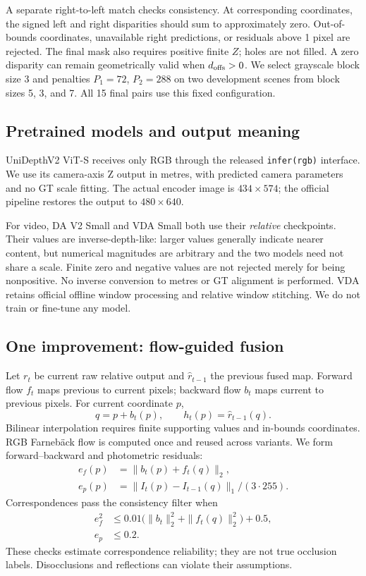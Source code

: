 A separate right-to-left match checks consistency. At corresponding coordinates, the signed left and right disparities should sum to approximately zero. Out-of-bounds coordinates, unavailable right predictions, or residuals above 1 pixel are rejected. The final mask also requires positive finite $Z$; holes are not filled. A zero disparity can remain geometrically valid when $d_{\rm offs}>0$. We select grayscale block size 3 and penalties $P_1=72$, $P_2=288$ on two development scenes from block sizes 5, 3, and 7. All 15 final pairs use this fixed configuration.

\subsection{Pretrained models and output meaning}
UniDepthV2 ViT-S receives only RGB through the released \texttt{infer(rgb)} interface. We use its camera-axis Z output in metres, with predicted camera parameters and no GT scale fitting. The actual encoder image is $434\times574$; the official pipeline restores the output to $480\times640$.

For video, DA V2 Small and VDA Small both use their \emph{relative} checkpoints. Their values are inverse-depth-like: larger values generally indicate nearer content, but numerical magnitudes are arbitrary and the two models need not share a scale. Finite zero and negative values are not rejected merely for being nonpositive. No inverse conversion to metres or GT alignment is performed. VDA retains official offline window processing and relative window stitching. We do not train or fine-tune any model.

\subsection{One improvement: flow-guided fusion}
Let $r_t$ be current raw relative output and $\widehat r_{t-1}$ the previous fused map. Forward flow $f_t$ maps previous to current pixels; backward flow $b_t$ maps current to previous pixels. For current coordinate $p$,
\begin{equation}
q=p+b_t(p),\qquad h_t(p)=\widehat r_{t-1}(q).
\end{equation}
Bilinear interpolation requires finite supporting values and in-bounds coordinates. RGB Farneb\"ack flow is computed once and reused across variants. We form forward--backward and photometric residuals:
\begin{align}
e_f(p)&=\|b_t(p)+f_t(q)\|_2,\\
e_p(p)&=\|I_t(p)-I_{t-1}(q)\|_1/(3\cdot255).
\end{align}
Correspondences pass the consistency filter when
\begin{align}
e_f^2&\leq0.01\big(\|b_t\|_2^2+\|f_t(q)\|_2^2\big)+0.5,\\
e_p&\leq0.2.
\end{align}
These checks estimate correspondence reliability; they are not true occlusion labels. Disocclusions and reflections can violate their assumptions.

